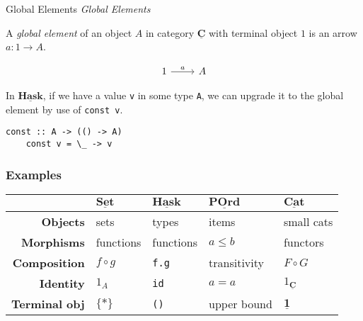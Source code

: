 \documentclass[10pt]{beamer}
\newcommand{\Cat}[1]{\ensuremath{\underline{\mathbf{#1}}}}
\theoremstyle{definition}
\theoremstyle{remark}
\numberwithin{equation}{section}
\begin{document}
\begin{frame}{Global Elements}
  \emph{Global Elements}

  A \emph{global element} of an object $A$ in category $\Cat{C}$ with terminal object $1$ is an arrow $a : 1 \rightarrow A$.
  
  \[
  \begin{tikzcd}
    1 \arrow{r}{a} & A
  \end{tikzcd}
  \]

  In \Cat{Hask}, if we have a value \lstinline{v} in some type \lstinline{A}, we
  can upgrade it to the global element by use of \lstinline{const v}.

  \begin{lstlisting}[frame=single]
    const :: A -> (() -> A)
    const v = \_ -> v
  \end{lstlisting}

\end{frame}

\begin{frame}[fragile]
  \frametitle{Examples}

  \begin{center}
    \begin{tabular}{r l l l l}\toprule
    & $\Cat{Set}$ & $\Cat{Hask}$ & $\Cat{POrd}$ & $\Cat{Cat}$ \\\midrule
    \textbf{Objects} & sets & types & items & small cats \\
    \textbf{Morphisms} & functions & functions & $a \leq b$ & functors \\
    \textbf{Composition} & $f \circ g$ & \lstinline!f.g! & transitivity & $F \circ G$ \\
    \textbf{Identity} & $1_A$ & {\lstinline!id!} & $a = a$ & $1_{\Cat{C}}$ \\
      \textbf{Terminal obj\rlap{.}} & $\{*\}$ & \lstinline!()! & upper bound & $\Cat{1}$ \\\bottomrule
  \end{tabular}
  \end{center}
  
\end{frame}
\end{document}
